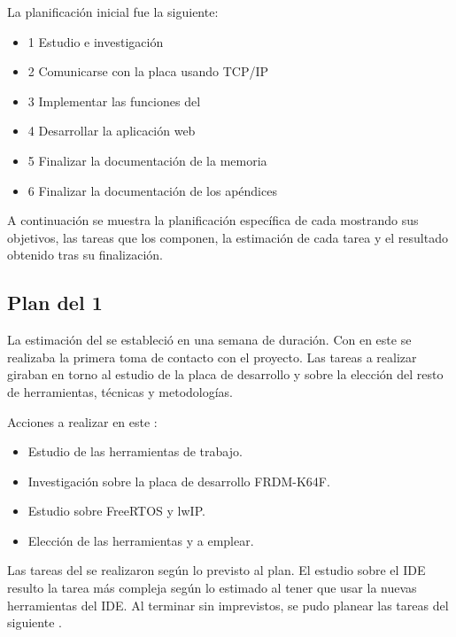 La planificación inicial fue la siguiente:
\begin{itemize}
  \item {} 1 Estudio e investigación
  \item {} 2 Comunicarse con la placa usando TCP/IP 
  \item {} 3 Implementar las funciones del 
  \item {} 4 Desarrollar la aplicación web
  \item {} 5 Finalizar la documentación de la memoria
  \item {} 6 Finalizar la documentación de los apéndices
\end{itemize}

A continuación se muestra la planificación específica de cada
 mostrando sus objetivos, las tareas que los componen,
la estimación de cada tarea y el resultado obtenido tras su finalización.

\clearpage

\subsection{Plan del  1} \label{sec:plan-s1}
La estimación del  se estableció en una semana de
duración. Con en este  se realizaba la primera toma de
contacto con el proyecto. Las tareas a realizar giraban en torno al estudio de
la placa de desarrollo y sobre la elección del resto de herramientas, técnicas y
metodologías.

Acciones a realizar en este :
\begin{itemize}
  \item Estudio de las herramientas de trabajo.
  \item Investigación sobre la placa de desarrollo FRDM-K64F.
  \item Estudio sobre FreeRTOS y lwIP.
  \item Elección de las herramientas y  a emplear.    
\end{itemize}


Las tareas del  se realizaron según lo previsto al plan.
El estudio sobre el IDE resulto la tarea más compleja según lo estimado al 
tener que usar la nuevas herramientas del IDE. Al terminar sin imprevistos,
se pudo planear las tareas del siguiente .

